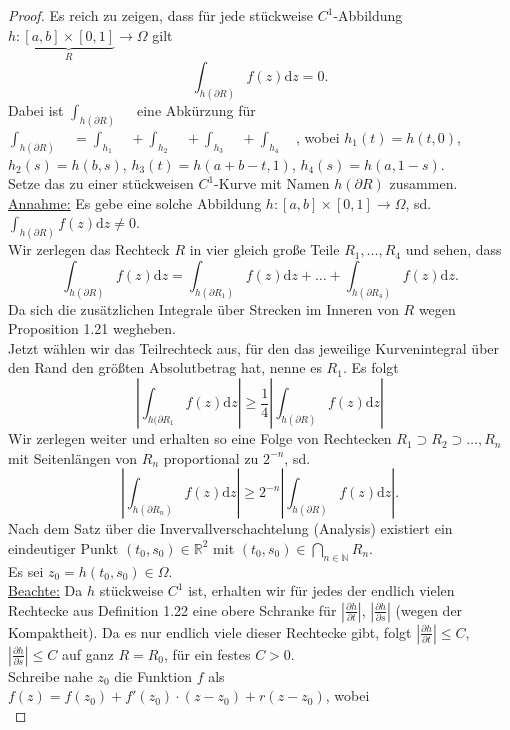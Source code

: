 \documentclass[11pt,titlepage]{article}
\theoremstyle{definition}
\theoremstyle{remark}
\begin{document}
	\begin{proof}
		Es reich zu zeigen, dass für jede stückweise $C^1$-Abbildung $h:\underbrace{[a,b]\times [0,1]}_
		{R}\to\Omega$ gilt
		\[ \int_{h(\partial R)} f(z) \mathrm{d}z =0. \]
		Dabei ist $\int_{h(\partial R)}\quad$ eine Abkürzung für $\int_{h(\partial R)}\quad =
		\int_{h_1}\quad +\int_{h_2}\quad +\int_{h_3}\quad +\int_{h_4}\quad$, wobei 
		$h_1 (t)=h(t,0)$, $h_2 (s)=h(b,s)$, $h_3 (t)=h(a+b-t,1)$, $h_4 (s)=h(a,1-s)$. \\
		Setze das zu einer stückweisen $C^1$-Kurve mit Namen $h(\partial R)$ zusammen. \\
		\underline{Annahme:} Es gebe eine solche Abbildung $h:[a,b]\times [0,1]\to \Omega$, sd. 
		$\int_{h(\partial R)} f(z)\mathrm{d}z \neq 0$. \\
		Wir zerlegen das Rechteck $R$ in vier gleich große Teile $R_1 ,\ldots,R_4$ und sehen, dass
		\[ \int_{h(\partial R)} f(z)\mathrm{d}z = \int_{h(\partial R_1)} f(z)\mathrm{d}z +\ldots +
		\int_{h(\partial R_4)} f(z)\mathrm{d}z. \]
		Da sich die zusätzlichen Integrale über Strecken im Inneren von $R$ wegen Proposition 1.21 
		wegheben. \\
		Jetzt wählen wir das Teilrechteck aus, für den das jeweilige Kurvenintegral über den Rand den 
		größten Absolutbetrag hat, nenne es $R_1$. Es folgt 
		\[ \left| \int_{h(\partial R_1}f(z)\mathrm{d}z\right| \geq \frac{1}{4} \left|\int_{h(\partial R)}f(z)
		\mathrm{d}z \right| \]
		Wir zerlegen weiter und erhalten so eine Folge von Rechtecken $R_1 \supset R_2 \supset\ldots 
		,R_n$ mit Seitenlängen von $R_n$ proportional zu $2^{-n}$, sd.
		\[ \left| \int_{h(\partial R_n)} f(z)\mathrm{d}z \right| \geq 2^{-n} \left| \int_{h(\partial R)}f(z)
		\mathrm{d}z \right|. \]
		Nach dem Satz über die Invervallverschachtelung (Analysis) existiert ein eindeutiger Punkt 
		$(t_0,s_0)\in\mathbb{R}^2$ mit $(t_0,s_0)\in  \bigcap_{n\in\mathbb{N}}R_n$. \\
		Es sei $z_0 =h(t_0,s_0)\in\Omega$.\\
		\underline{Beachte:} Da $h$ stückweise $C^1$ ist, erhalten wir für jedes der endlich vielen 
		Rechtecke aus Definition 1.22 eine obere Schranke für $|\frac{\partial h}{\partial t}|$, 
		$|\frac{\partial h}{\partial s}|$ (wegen der Kompaktheit). 
		Da es nur endlich viele dieser Rechtecke gibt, folgt $|\frac{\partial h}{\partial t}|\leq C$, 
		$|\frac{\partial h}{\partial s}| \leq C$ auf ganz $R=R_0$, für ein festes $C>0$. \\
		Schreibe nahe $z_0$ die Funktion $f$ als $f(z)=f(z_0)+f'(z_0)\cdot (z-z_0)+r(z-z_0)$, wobei \\

\end{proof}
\end{document}
